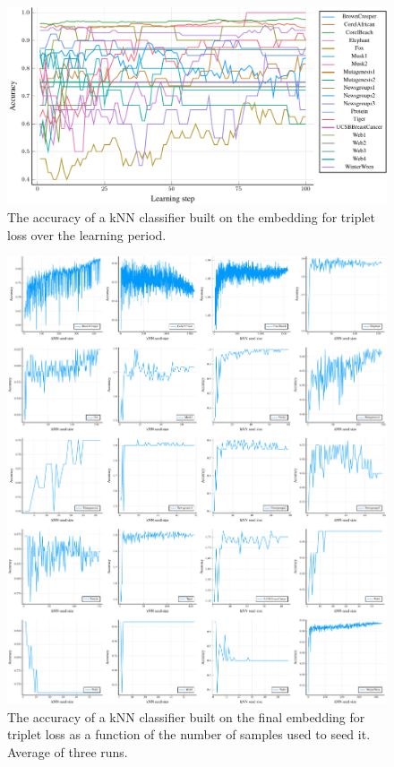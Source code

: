 \begin{figure}[h]
  \centering
  \includegraphics[width=\textwidth]{images/triplet-toy/accuracy/triplet-toy-accuracy.pdf}
  \caption{The accuracy of a kNN classifier built on the embedding for triplet loss over the learning period.}\label{fig:triplet-toy-accuracy}
\end{figure}

\begin{figure}[h]
  \centering
  \includegraphics[width=\textwidth]{images/triplet-toy/kNN/triplet-toy-kNN.pdf}
  \caption{The accuracy of a kNN classifier built on the final embedding for triplet loss as a function of the number of samples used to seed it. Average of three runs.}\label{fig:triplet-toy-kNN}
\end{figure}

